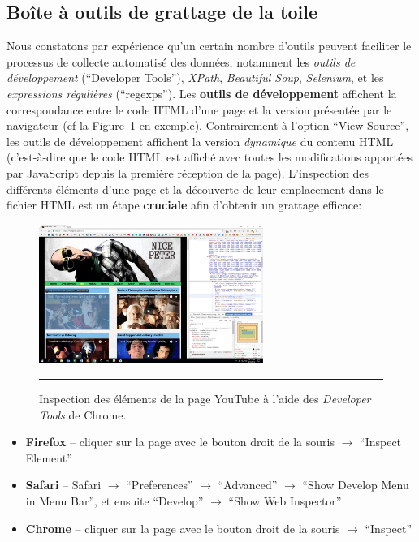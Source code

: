 \subsection{Boîte à outils de grattage de la toile}
Nous constatons par expérience qu'un certain nombre d'outils peuvent faciliter le processus de collecte automatisé des données, notamment les \textit{outils de développement} (``Developer Tools''), \textit{XPath}, \textit{Beautiful Soup}, \textit{Selenium}, et les \textit{expressions régulières} (``regexps''). 
\newl Les \textbf{outils de développement} affichent la correspondance entre le code HTML d'une page et la version présentée par le navigateur (cf la Figure~\ref{fig:erb} en exemple). Contrairement à l'option ``View Source'', les outils de développement affichent la version \textit{dynamique} du contenu HTML (c'est-à-dire que le code HTML est affiché avec toutes les modifications apportées par JavaScript depuis la première réception de la page). \newl L'inspection des différents éléments d'une page et la découverte de leur emplacement dans le fichier HTML est un étape \textbf{cruciale} afin d'obtenir un grattage efficace: 
\begin{figure}[t]
\centering
\includegraphics[width=0.65\textwidth]{Images/erb.png}
\caption{\small Inspection des éléments de la page YouTube   à l'aide des \textit{Developer Tools} de Chrome.} \hrule\label{fig:erb}
\end{figure}
\begin{itemize}[noitemsep]
\item \textbf{Firefox} -- cliquer sur la page avec le bouton droit de la souris $\to$ ``Inspect Element''
\item \textbf{Safari} -- Safari $\to$ ``Preferences'' $\to$ ``Advanced'' $\to$ ``Show Develop Menu in Menu Bar'', et ensuite ``Develop'' $\to$ ``Show Web Inspector''
\item \textbf{Chrome} --  cliquer sur la page avec le bouton droit de la souris $\to$ ``Inspect''
\end{itemize}
